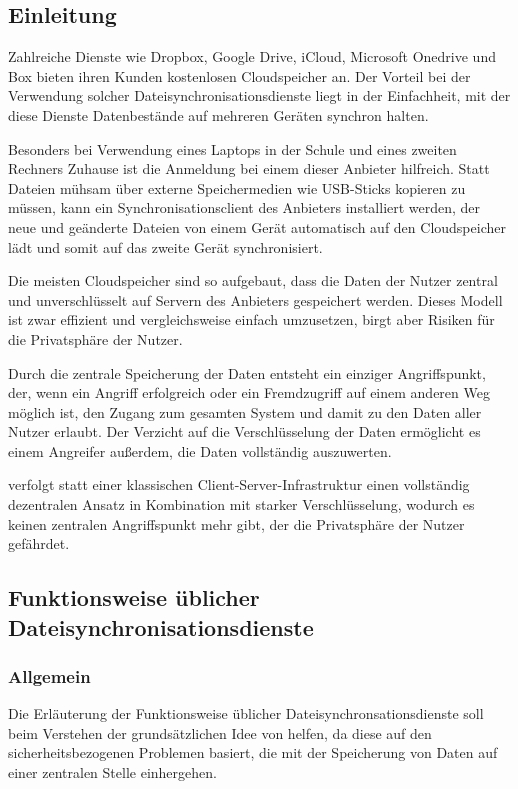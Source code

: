 \subsection{Einleitung}
Zahlreiche Dienste wie Dropbox, Google Drive, iCloud, Microsoft Onedrive und Box
bieten ihren Kunden kostenlosen Cloudspeicher an.
Der Vorteil bei der Verwendung solcher Dateisynchronisationsdienste liegt in der
Einfachheit, mit der diese Dienste Datenbestände auf mehreren Geräten synchron
halten.

Besonders bei Verwendung eines Laptops in der Schule und eines zweiten Rechners
Zuhause ist die Anmeldung bei einem dieser Anbieter hilfreich.
Statt Dateien mühsam über externe Speichermedien wie USB-Sticks kopieren zu
müssen, kann ein Synchronisationsclient des Anbieters installiert werden, der
neue und geänderte Dateien von einem Gerät automatisch auf den Cloudspeicher
lädt und somit auf das zweite Gerät synchronisiert.

Die meisten Cloudspeicher sind so aufgebaut, dass die Daten der Nutzer zentral
und unverschlüsselt auf Servern des Anbieters gespeichert werden.
Dieses Modell ist zwar effizient und vergleichsweise einfach umzusetzen, birgt
aber Risiken für die Privatsphäre der Nutzer.

Durch die zentrale Speicherung der Daten entsteht ein einziger Angriffspunkt,
der, wenn ein Angriff erfolgreich oder ein Fremdzugriff auf einem anderen Weg
möglich ist, den Zugang zum gesamten System und damit zu den Daten aller Nutzer
erlaubt.
Der Verzicht auf die Verschlüsselung der Daten ermöglicht es einem Angreifer
außerdem, die Daten vollständig auszuwerten.

\sblitg verfolgt statt einer klassischen Client-Server-Infrastruktur einen
vollständig dezentralen Ansatz in Kombination mit starker Verschlüsselung,
wodurch es keinen zentralen Angriffspunkt mehr gibt, der die Privatsphäre der Nutzer gefährdet.

\subsection{Funktionsweise üblicher Dateisynchronisationsdienste}
\subsubsection{Allgemein}
Die Erläuterung der Funktionsweise üblicher Dateisynchronsationsdienste soll beim
Verstehen der grundsätzlichen Idee von \sblit helfen, da diese auf den
sicherheitsbezogenen Problemen basiert, die mit der Speicherung von Daten auf einer
zentralen Stelle einhergehen.

